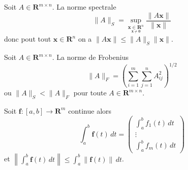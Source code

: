 \begin{definition}
Soit $A\in \mathbf{R}^{m\times n}$. La norme spectrale 
$$
\lVert A \rVert_{S} =\sup_{\underset{\boldsymbol{x}\neq \boldsymbol{0}}{\boldsymbol{x}\in \mathbf{R}^{n}}} \frac{\lVert A\boldsymbol{x} \rVert }{\lVert \boldsymbol{x} \rVert}
$$
donc pout tout $\boldsymbol{x}\in \mathbf{R}^{n}$ on a $\lVert A\boldsymbol{x} \rVert\le \lVert A \rVert_{S} \lVert \boldsymbol{x} \rVert$.
\end{definition}
\begin{definition}
Soit $A\in \mathbf{R}^{m\times n}$. La norme de Frobenius
$$
\lVert A \rVert _{F}=\left( \sum_{i=1}^{m} \sum_{j=1}^{n} A_{ij}^{2}  \right)^{1/2}
$$
ou $\lVert A \rVert_{S} <\lVert A \rVert_{F}$ pour toute $A\in \mathbf{R}^{m\times n}$.
\end{definition}
\begin{lemma}
Soit $\boldsymbol{f}:[a,b]\to \mathbf{R}^{m}$ continue alors
$$
\int_{a}^{b} \boldsymbol{f}(t) \, dt=\begin{pmatrix}
\int_{a}^{b} f_{1}(t) \, dt \\
\vdots \\
\int_{a}^{b} f_{m}(t) \, dt  
\end{pmatrix} 
$$
et $\left\lVert  \int_{a}^{b} \boldsymbol{f}(t) \, dt  \right\rVert\le \int_{a}^{b} \lVert \boldsymbol{f}(t) \rVert \, dt$.
\end{lemma}
